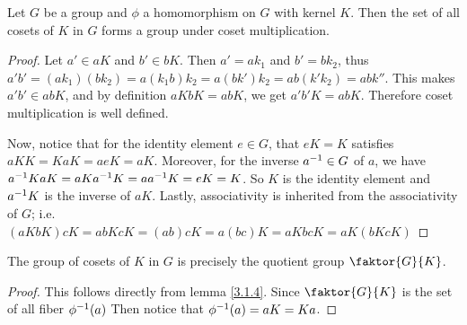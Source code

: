 \begin{theorem}\label{theorem_3.1.6}
  Let $G$ be a group and  $\phi$ a homomorphism on $G$ with kernel  $K$. Then
  the set of all cosets of  $K$ in  $G$ forms a group under coset
  multiplication.
\end{theorem}
\begin{proof}
  Let $a' \in aK$ and  $b' \in bK$. Then  $a'=ak_1$ and $b'=bk_2$, thus
  $a'b'=(ak_1)(bk_2)=a(k_1b)k_2=a(bk')k_2=ab(k'k_2)=abk''$. This makes $a'b'
  \in abK$, and by definition  $aKbK=abK$, we get  $a'b'K=abK$. Therefore
  coset multiplication is well defined.

  Now, notice that for the identity element  $e \in G$, that $eK=K$ satisfies
  $aKK=KaK=aeK=aK$. Moreover, for the inverse  $a^{-1} \in G$ of $a$, we have
  $a^{-1}KaK=aKa^{-1}K=aa^{-1}K=eK=K$. So $K$ is the identity element and
  $a^{-1}K$ is the inverse of  $aK$. Lastly, associativity is inherited from
  the associativity of $G$; i.e.
  $(aKbK)cK=abKcK=(ab)cK=a(bc)K=aKbcK=aK(bKcK)$
\end{proof}
\begin{corollary}
  The group of cosets of $K$ in  $G$ is precisely the quotient group
  $\faktor{G}{K}$.
\end{corollary}
\begin{proof}
  This follows directly from lemma \ref{3.1.4}. Since $\faktor{G}{K}$ is the
  set of all fiber $\phi^{-1}(a)$ Then notice that $\phi^{-1}(a)=aK=Ka$.
\end{proof}

